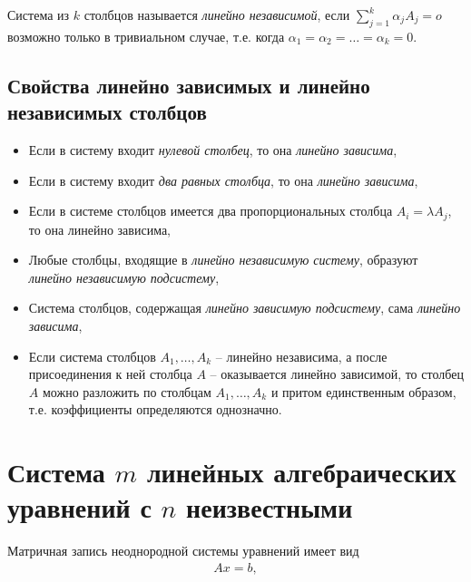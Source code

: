 \documentclass[%
	11pt,
	a4paper,
	utf8,
		]{article}
\begin{document}
Система из $ k $ столбцов называется \emph{линейно независимой}, если $ \sum\limits_{j=1}^k \alpha_j A_j = o $ возможно только в тривиальном случае, т.е. когда $ \alpha_1 = \alpha_2 = \ldots = \alpha_k = 0 $.

\subsection{Свойства линейно зависимых и линейно независимых столбцов}


\begin{itemize}
	\item Если в систему входит \emph{нулевой столбец}, то она \emph{линейно зависима},
	
	\item Если в систему входит \emph{два равных столбца}, то она \emph{линейно зависима},
	
	\item Если в системе столбцов имеется два пропорциональных столбца $ A_i = \lambda A_j $, то она линейно зависима,
	
	\item Любые столбцы, входящие в \emph{линейно независимую систему}, образуют \emph{линейно независимую подсистему},
	
	\item Система столбцов, содержащая \emph{линейно зависимую подсистему}, сама \emph{линейно зависима},
	
	\item Если система столбцов $ A_1, \ldots,A_k $ -- линейно независима, а после присоединения к ней столбца $ A $ -- оказывается линейно зависимой, то столбец $ A $ можно разложить по столбцам $ A_1, \ldots, A_k $ и притом единственным образом, т.е. коэффициенты определяются однозначно.
\end{itemize}

\section{Система $ m $ линейных алгебраических уравнений с $ n $ неизвестными}

Матричная запись неоднородной системы уравнений имеет вид
\vspace*{-3mm}
\begin{align*}
	A x = b,
\end{align*}
\end{document}
